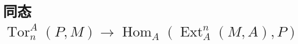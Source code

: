 \section{同态 \texorpdfstring{$\operatorname{Tor}_{n}^{A}(P,M)\to\operatorname{Hom}_{A}(\operatorname{Ext}_{A}^{n}(M,A),P)$}{TornA(P,M)->HomA(ExtAn(M,A),P)}}
